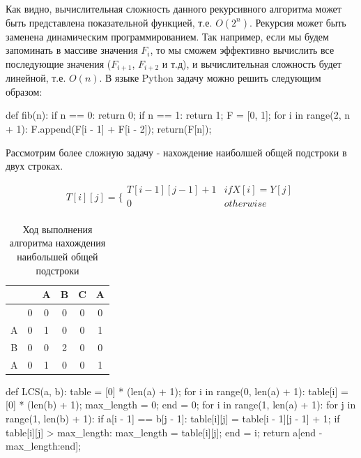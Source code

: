 Как видно, вычислительная сложность данного рекурсивного алгоритма 
может быть представлена показательной функцией, т.е. $O(2^n)$. Рекурсия может 
быть заменена динамическим программированием. 
Так например, если мы будем запоминать в массиве значения $F_i$, то мы сможем
эффективно вычислить все последующие значения ($F_{i+1}$, $F_{i+2}$ и т.д), и 
вычислительная сложность будет линейной, т.е. $O(n)$. В языке Python задачу 
можно решить следующим образом:

\begin{python}
def fib(n):
	if n == 0:
		return 0;
	if n == 1:
		return 1;
	F = [0, 1];
	for i in range(2, n + 1):
		F.append(F[i - 1] + F[i - 2]);
	return(F[n]);
\end{python}


Рассмотрим более сложную задачу - нахождение наиболшей общей подстроки в двух строках.

$$
T[i][j] = \Bigg\{
	\begin{array}{cc}
      T[i - 1][j - 1] + 1 & if X[i] = Y[j] \\
      0 & otherwise \\
    \end{array}
$$

\begin{table}
\centering
\begin{tabular}{|c|c|c|c|c|c|}
	\hline
	&   & \cellcolor{blue}A & \cellcolor{blue}B & \cellcolor{blue}C & \cellcolor{blue}A \\\hline
	& \cellcolor{lightblue}0 & \cellcolor{lightblue}0 & \cellcolor{lightblue}0 & \cellcolor{lightblue}0 & \cellcolor{lightblue}0 \\\hline
	\cellcolor{blue}A & \cellcolor{lightblue}0 & \cellcolor{red}1 & \cellcolor{lightblue}0 & \cellcolor{lightblue}0 & \cellcolor{red}1 \\\hline
	\cellcolor{blue}B & \cellcolor{lightblue}0 & \cellcolor{lightblue}0 & \cellcolor{red}2 & \cellcolor{lightblue}0 & \cellcolor{lightblue}0 \\\hline
	\cellcolor{blue}A & \cellcolor{lightblue}0 & \cellcolor{red}1 & \cellcolor{lightblue}0 & \cellcolor{lightblue}0 & \cellcolor{red}1 \\\hline
\end{tabular}
\caption{Ход выполнения алгоритма нахождения наибольшей общей подстроки}
\end{table}

\begin{python}
def LCS(a, b):
	table = [0] * (len(a) + 1);
	for i in range(0, len(a) + 1):
		table[i] = [0] * (len(b) + 1);
	max_length = 0;
	end = 0;
	for i in range(1, len(a) + 1):
		for j in range(1, len(b) + 1):
			if a[i - 1] == b[j - 1]:
				table[i][j] = table[i - 1][j - 1] + 1;
				if table[i][j] > max_length:
					max_length = table[i][j];
					end = i;
	return a[end - max_length:end];
\end{python}


